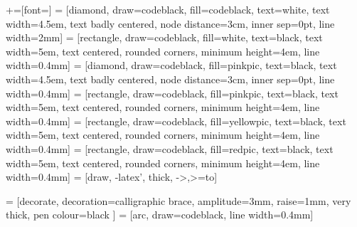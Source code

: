 +=[font=\footnotesize\sffamily]
\usetikzlibrary{calc, shapes, arrows, decorations.pathreplacing, calligraphy,
                calligraphy}
 = [diamond, draw=codeblack, fill=codeblack, text=white,
    text width=4.5em, text badly centered, node distance=3cm, inner sep=0pt,
    line width=2mm]
 = [rectangle, draw=codeblack, fill=white,  text=black,
    text width=5em, text centered, rounded corners, minimum height=4em,
    line width=0.4mm]
 = [diamond, draw=codeblack, fill=pinkpic, text=black,
    text width=4.5em, text badly centered, node distance=3cm, inner sep=0pt,
    line width=0.4mm]
 = [rectangle, draw=codeblack, fill=pinkpic,  text=black,
    text width=5em, text centered, rounded corners, minimum height=4em,
    line width=0.4mm]
 = [rectangle, draw=codeblack, fill=yellowpic,  text=black,
    text width=5em, text centered, rounded corners, minimum height=4em,
    line width=0.4mm]
 = [rectangle, draw=codeblack, fill=redpic,  text=black,
    text width=5em, text centered, rounded corners, minimum height=4em,
    line width=0.4mm]
 = [draw, -latex', thick, ->,>=to]

 =  [decorate,  %
                 decoration={calligraphic brace, amplitude=3mm, raise=1mm},
                 very thick, pen colour={black} ]
 = [arc, draw=codeblack, line width=0.4mm]

